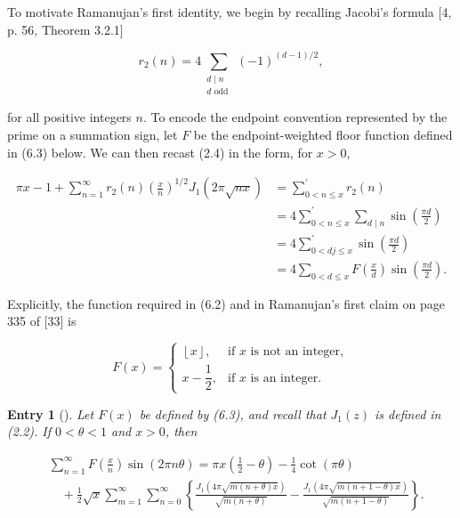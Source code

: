 \documentclass[10pt]{article}
\newcommand{\floor}[1]{\left\lfloor #1\right\rfloor}
\theoremstyle{plain}
\newtheorem{entry}[theorem]{Entry}
\begin{document}
To motivate Ramanujan's first identity, we begin by recalling Jacobi's formula [4, p. 56, Theorem 3.2.1]


\begin{equation*}
r_{2}(n)=4 \sum_{\substack{d \mid n \\ d \text { odd }}}(-1)^{(d-1) / 2}, \tag{6.1}
\end{equation*}


for all positive integers $n$. To encode the endpoint convention represented by the prime on a summation sign, let $F$ be the endpoint-weighted floor function defined in (6.3) below. We can then recast (2.4) in the form, for $x>0$,


\begin{align*}
\pi x-1+\sum_{n=1}^{\infty} r_{2}(n)\left(\frac{x}{n}\right)^{1 / 2} J_{1}(2 \pi \sqrt{n x}) & =\sum_{0<n \leq x}^{\prime} r_{2}(n) \\
& =4 \sum_{0<n \leq x}^{\prime} \sum_{d \mid n} \sin \left(\frac{\pi d}{2}\right) \\
& =4 \sum_{0<d j \leq x}^{\prime} \sin \left(\frac{\pi d}{2}\right) \\
& =4 \sum_{0<d \leq x}F\left(\frac{x}{d}\right) \sin \left(\frac{\pi d}{2}\right). \tag{6.2}
\end{align*}


Explicitly, the function required in (6.2) and in Ramanujan's first claim on page 335 of [33] is

\begin{equation*}
F(x)=
\begin{cases}
\floor{x}, & \text{if $x$ is not an integer},\\
x-\dfrac{1}{2}, & \text{if $x$ is an integer}.
\end{cases}
\tag{6.3}
\end{equation*}

\begin{entry}[{\normalfont [33, p.~335]}]
Let $F(x)$ be defined by (6.3), and recall that $J_{1}(z)$ is defined in (2.2). If $0<\theta<1$ and $x>0$, then


\begin{align*}
& \sum_{n=1}^{\infty} F\left(\frac{x}{n}\right) \sin (2 \pi n \theta)=\pi x\left(\frac{1}{2}-\theta\right)-\frac{1}{4} \cot (\pi \theta)  \tag{6.4}\\
& \quad+\frac{1}{2} \sqrt{x} \sum_{m=1}^{\infty} \sum_{n=0}^{\infty}\left\{\frac{J_{1}(4 \pi \sqrt{m(n+\theta) x})}{\sqrt{m(n+\theta)}}-\frac{J_{1}(4 \pi \sqrt{m(n+1-\theta) x})}{\sqrt{m(n+1-\theta)}}\right\} .
\end{align*}
\end{entry}
\end{document}
